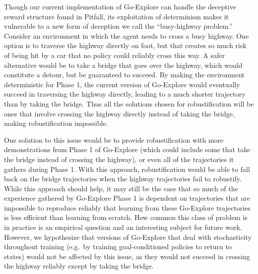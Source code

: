 \documentclass{article}
\begin{document}
Though our current implementation of Go-Explore can handle the deceptive reward structure found in Pitfall, its exploitation of determinism makes it vulnerable to a new form of deception we call the ``busy-highway problem.'' Consider an environment in which the agent needs to cross a busy highway. One option is to traverse the highway directly on foot, but that creates so much risk of being hit by a car that no policy could reliably cross this way. A safer alternative would be to take a bridge that goes over the highway, which would constitute a detour, but be guaranteed to succeed. By making the environment deterministic for Phase 1, the current version of Go-Explore would eventually succeed in traversing the highway directly, leading to a much shorter trajectory than by taking the bridge. Thus all the solutions chosen for robustification will be ones that involve crossing the highway directly instead of taking the bridge, making robustification impossible.

One solution to this issue would be to provide robustification with more demonstrations from Phase 1 of Go-Explore (which could include some that take the bridge instead of crossing the highway), or even all of the trajectories it gathers during Phase 1. With this approach, robustification would be able to fall back on the bridge trajectories when the highway trajectories fail to robustify. While this approach should help, it may still be the case that so much of the experience gathered by Go-Explore Phase 1 is dependent on trajectories that are impossible to reproduce reliably that learning from these Go-Explore trajectories is less efficient than learning from scratch. How common this class of problem is in practice is an empirical question and an interesting subject for future work. However, we hypothesize that versions of Go-Explore that deal with stochasticity throughout training (e.g.\ by training goal-conditioned policies to return to states) would not be affected by this issue, as they would not succeed in crossing the highway reliably except by taking the bridge.
\end{document}
